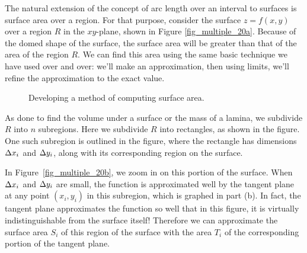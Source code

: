 The natural extension of the concept of arc length over an interval to surfaces is surface area over a region. For that purpose, consider the surface $z=f(x,y)$ over a region $R$ in the $xy$-plane, shown in Figure \ref{fig_multiple_20a}. Because of the domed shape of the surface, the surface area will be greater than that of the area of the region $R$. We can find this area using the same basic technique we have used over and over: we'll make an approximation, then using limits, we'll refine the approximation to the exact value.


\begin{figure}
\centering
\qquad
{}
\caption{Developing a method of computing surface area.}
\end{figure}



As done to find the volume under a surface or the mass of a lamina, we subdivide $R$ into $n$ subregions. Here we subdivide $R$ into rectangles, as shown in the figure. One such subregion is outlined in the figure, where the rectangle has dimensions $\Delta x_i$ and $\Delta y_i$, along with its corresponding region on the surface.

In Figure~\ref{fig_multiple_20b}, we zoom in on this portion of the surface. When $\Delta x_i$ and $\Delta y_i$ are small, the function is approximated well by the tangent plane at any point $(x_i,y_i)$ in this subregion, which is graphed in part (b). In fact, the tangent plane approximates the function so well that in this figure, it is virtually indistinguishable from the surface itself! Therefore we can approximate the surface area $S_i$ of this region of the surface with the area $T_i$ of the corresponding portion of the tangent plane.

